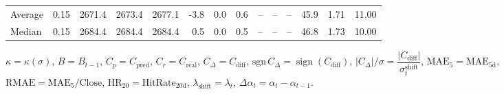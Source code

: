 \begin{threeparttable}
{\begin{tabular}{lrrrrrrrrrrrrr}
Average &     0.15 & 2671.4 & 2673.4 & 2677.1 &       -3.8 &                      0.0 &                 0.6 &         -- &        -- &             -- &             45.9 &            1.71 &                  11.00 \\
 Median &     0.15 & 2684.4 & 2684.4 & 2684.4 &        0.5 &                      0.0 &                 0.5 &         -- &        -- &             -- &             46.8 &            1.73 &                  10.00 \\
\bottomrule
\end{tabular}
}
\begin{tablenotes}\footnotesize
\item $\kappa=\kappa(\sigma)$, $B=B_{t-1}$, $C_p=C_{\text{pred}}$, $C_r=C_{\text{real}}$, $C_\Delta=C_{\text{diff}}$, $\mathrm{sgn}\,C_\Delta=\operatorname{sign}(C_{\text{diff}})$, $|C_\Delta|/\sigma=\dfrac{|C_{\text{diff}}|}{\sigma_t^{\text{shift}}}$, $\mathrm{MAE}_5=\mathrm{MAE}_{5\text{d}}$, $\mathrm{RMAE}= \mathrm{MAE}_5 / \text{Close}$, $\mathrm{HR}_{20}=\mathrm{HitRate}_{20\text{d}}$, 
$\lambda_{\text{shift}}=\lambda_t$, 
$\Delta\alpha_t=\alpha_t-\alpha_{t-1}$.
\end{tablenotes}
\end{threeparttable}
\endgroup

